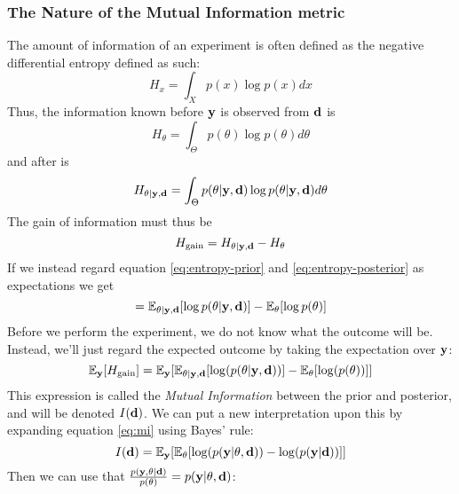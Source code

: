 \subsubsection{The Nature of the Mutual Information metric}
The amount of information of an experiment is often defined as the negative differential entropy defined as such\cite{lindley56}:
\begin{equation}H_x = \int_{X}p(x)\log p(x)dx\end{equation}
Thus, the information known before $\mathbf{y}$ is observed from $\mathbf{d}$ is
\begin{equation}\label{eq:entropy-prior}H_\theta = \int_{\Theta}p(\theta)\log p(\theta)d\theta\end{equation}
and after is
\begin{equation}\label{eq:entropy-posterior}H_{\theta | \mathbf{y}, \mathbf{d}} = \int_{\Theta}p(\theta| \mathbf{y}, \mathbf{d})\log p(\theta| \mathbf{y}, \mathbf{d})d\theta\end{equation}
The gain of information must thus be
\begin{equation}H_\textrm{gain} = H_{\theta | \mathbf{y}, \mathbf{d}} - H_\theta\end{equation}
If we instead regard equation \ref{eq:entropy-prior} and \ref{eq:entropy-posterior} as expectations we get
\begin{equation} = \mathbb{E}_{\theta | \mathbf{y}, \mathbf{d}}[\log p(\theta | \mathbf{y}, \mathbf{d})] - \mathbb{E}_\theta [\log p(\theta )]\end{equation}
Before we perform the experiment, we do not know what the outcome will be. Instead, we'll just regard the expected outcome by taking the expectation over $\mathbf{y}$:
\begin{equation} \label{eq:mi}\mathbb{E}_{\mathbf{y}}[H_\textrm{gain}]  = \mathbb{E}_{\mathbf{y}}[\mathbb{E}_{\theta | \mathbf{y}, \mathbf{d}} [\log(p(\theta | \mathbf{y}, \mathbf{d}))] - \mathbb{E}_{\theta}[\log(p(\theta))]]\end{equation}
This expression is called the \textit{Mutual Information} between the prior and posterior, and will be denoted $I(\mathbf{d})$.
We can put a new interpretation upon this by expanding equation \ref{eq:mi} using Bayes' rule:
\begin{equation} I(\mathbf{d})  = \mathbb{E}_{\mathbf{y}}[\mathbb{E}_\theta [\log(p(\mathbf{y} | \mathbf{\theta}, \mathbf{d})) - \log(p(\mathbf{y}|\mathbf{d}))]]\end{equation} 
Then we can use that $\frac{p(\mathbf{y}, \mathbf{\theta}|\mathbf{d})}{p(\theta)}=p(\mathbf{y| \theta, \mathbf{d}})$:
